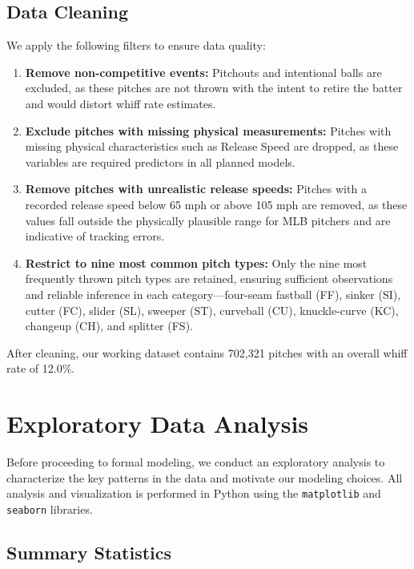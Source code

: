 \documentclass[11pt]{article}
\newcommand{\totalPitches}{702{,}321}    %
\newcommand{\overallWhiff}{12.0}         %
\begin{document}
\subsection{Data Cleaning}

We apply the following filters to ensure data quality:
\begin{enumerate}[nosep]
    \item \textbf{Remove non-competitive events:} Pitchouts and intentional balls are excluded, as these pitches are not thrown with the intent to retire the batter and would distort whiff rate estimates.
    \item \textbf{Exclude pitches with missing physical measurements:} Pitches with missing physical characteristics such as Release Speed are dropped, as these variables are required predictors in all planned models. 
    \item \textbf{Remove pitches with unrealistic release speeds:} Pitches with a recorded release speed below 65 mph or above 105 mph are removed, as these values fall outside the physically plausible range for MLB pitchers and are indicative of tracking errors.
    \item \textbf{Restrict to nine most common pitch types:} Only the nine most frequently thrown pitch types are retained, ensuring sufficient observations and reliable inference in each category---four-seam fastball (FF), sinker (SI), cutter (FC), slider (SL), sweeper (ST), curveball (CU), knuckle-curve (KC), changeup (CH), and splitter (FS).
\end{enumerate}
After cleaning, our working dataset contains \totalPitches{} pitches with an overall whiff rate of \overallWhiff\%.

\section{Exploratory Data Analysis}

Before proceeding to formal modeling, we conduct an exploratory analysis to characterize the key patterns in the data and motivate our modeling choices.
All analysis and visualization is performed in Python using the \texttt{matplotlib} \citep{matplotlib2007} and \texttt{seaborn} \citep{seaborn2021} libraries.

\subsection{Summary Statistics}
\end{document}
